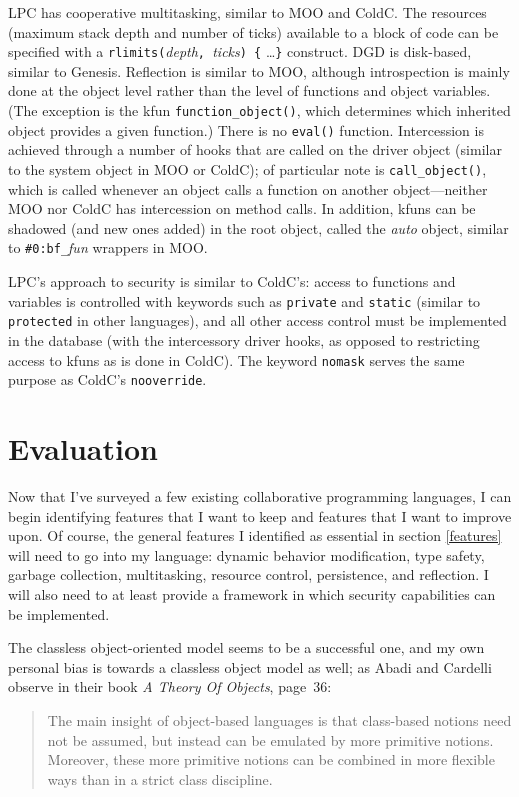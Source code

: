 \documentclass{article}
\begin{document}
LPC has cooperative multitasking, similar to MOO and ColdC.  The
resources (maximum stack depth and number of ticks) available to a
block of code can be specified with a
\texttt{rlimits(}\textit{depth}\texttt{, }\textit{ticks}\texttt{) \{}
\ldots \texttt{\}} construct.  DGD is disk-based, similar to Genesis.
Reflection is similar to MOO, although introspection is mainly done at 
the object level rather than the level of functions and object
variables.  (The exception is the kfun \texttt{function\_object()},
which determines which inherited object provides a given function.)
There is no \texttt{eval()} function.  Intercession is achieved through 
a number of hooks that are called on the driver object (similar to the
system object in MOO or ColdC); of particular note is
\texttt{call\_object()}, which is called whenever an object calls a
function on another object---neither MOO nor ColdC has intercession on 
method calls.  In addition, kfuns can be shadowed (and new ones added) 
in the root object, called the \emph{auto} object, similar to
\texttt{\#0:bf\_}\textit{fun} wrappers in MOO.

LPC's approach to security is similar to ColdC's: access to functions
and variables is controlled with keywords such as \texttt{private} and
\texttt{static} (similar to \texttt{protected} in other languages),
and all other access control must be implemented in the database
(with the intercessory driver hooks, as opposed to restricting access
to kfuns as is done in ColdC).  The keyword \texttt{nomask} serves the 
same purpose as ColdC's \texttt{nooverride}.

\section{Evaluation}
Now that I've surveyed a few existing collaborative programming
languages, I can begin identifying features that I want to keep and
features that I want to improve upon.  Of course, the general features
I identified as essential in section \ref{features} will need to go
into my language: dynamic behavior modification, type safety, garbage
collection, multitasking, resource control, persistence, and
reflection.  I will also need to at least provide a framework in which 
security capabilities can be implemented.

The classless object-oriented model seems to be a successful one, and
my own personal bias is towards a classless object model as well; as
Abadi and Cardelli observe in their book \emph{A Theory Of
Objects}\cite{theory-of-objects},
page~36:
\begin{quote}
The main insight of object-based languages is that class-based notions 
need not be assumed, but instead can be emulated by more primitive
notions.  Moreover, these more primitive notions can be combined in
more flexible ways than in a strict class discipline.
\end{quote}
\end{document}
